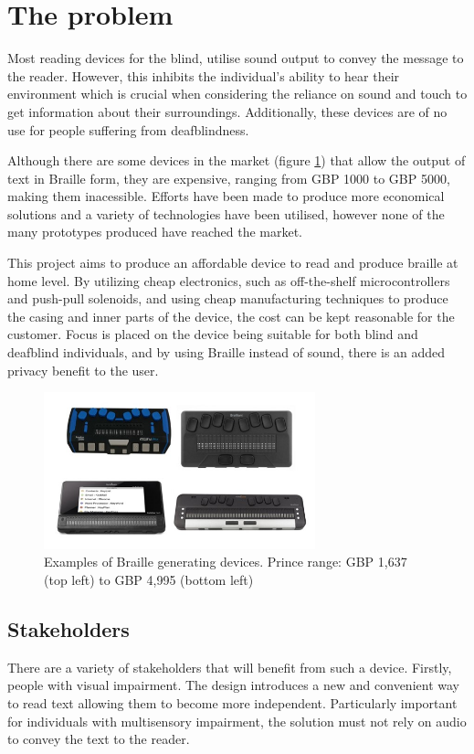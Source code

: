 \section{The problem}
Most reading devices for the blind, utilise sound output to convey the message to the reader.
However, this inhibits the individual's ability to hear their environment which is crucial when considering the reliance on sound and touch to get information about their surroundings.
Additionally, these devices are of no use for people suffering from deafblindness.

Although there are some devices in the market (figure \ref{fig:braille-readers-examples}) that allow the output of text in Braille form, they are expensive, ranging from GBP 1000 to GBP 5000, making them inacessible. Efforts have been made to produce more economical solutions and a variety of technologies have been utilised, however none of the many prototypes produced have reached the market.

This project aims to produce an affordable device to read and produce braille at home level.
By utilizing cheap electronics, such as off-the-shelf microcontrollers and push-pull solenoids, and using cheap manufacturing techniques to produce the casing and inner parts of the device, the cost can be kept reasonable for the customer.
Focus is placed on the device being suitable for both blind and deafblind individuals, and by using Braille instead of sound, there is an added privacy benefit to the user.
\begin{figure}[h]
\centering
    \includegraphics[width=0.7\textwidth]{figures/braille-readers-examples.jpg}
\caption[Examples of Braille generating devices]{Examples of Braille generating devices. Prince range: GBP 1,637 (top left) to GBP 4,995 (bottom left)}
\label{fig:braille-readers-examples}
\end{figure}

\subsection{Stakeholders}
There are a variety of stakeholders that will benefit from such a device.
Firstly, people with visual impairment.
The design introduces a new and convenient way to read text allowing them to become more independent.
Particularly important for individuals with multisensory impairment, the solution must not rely on audio to convey the text to the reader.

